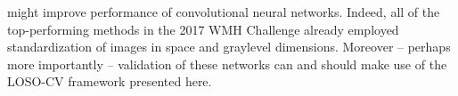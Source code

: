 might improve performance of convolutional neural networks.
Indeed, all of the top-performing methods in the 2017 WMH Challenge 
already employed standardization of images in space and graylevel dimensions.
Moreover -- perhaps more importantly -- validation of these networks 
can and should make use of the LOSO-CV framework presented here.

